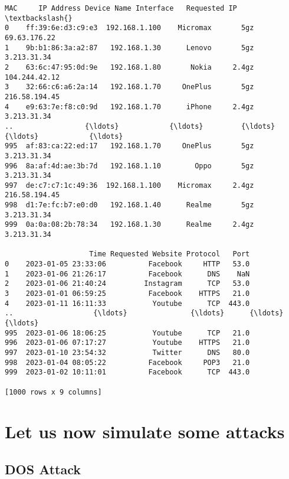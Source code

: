 \documentclass[11pt]{article}
\makeatletter
\newcommand{\boxspacing}{\kern\kvtcb@left@rule\kern\kvtcb@boxsep}
\newcommand{\prompt}[4]{
        {\ttfamily\llap{{\color{#2}[#3]:\hspace{3pt}#4}}\vspace{-\baselineskip}}
    }
\makeatother
\begin{document}
            \begin{tcolorbox}[breakable, size=fbox, boxrule=.5pt, pad at break*=1mm, opacityfill=0]
\prompt{Out}{outcolor}{36}{\boxspacing}
\begin{Verbatim}[commandchars=\\\{\}]
                   MAC     IP Address Device Name Interface   Requested IP  \textbackslash{}
0    ff:39:6e:d3:c9:e3  192.168.1.100    Micromax       5gz   69.63.176.22
1    9b:b1:86:3a:a2:87   192.168.1.30      Lenovo       5gz    3.213.31.34
2    63:6c:47:95:0d:9e   192.168.1.80       Nokia     2.4gz  104.244.42.12
3    32:66:c6:a6:2a:14   192.168.1.70     OnePlus       5gz  216.58.194.45
4    e9:63:7e:f8:c0:9d   192.168.1.70      iPhone     2.4gz    3.213.31.34
..                 {\ldots}            {\ldots}         {\ldots}       {\ldots}            {\ldots}
995  af:83:ca:22:ed:17   192.168.1.70     OnePlus       5gz    3.213.31.34
996  8a:af:4d:ae:3b:7d   192.168.1.10        Oppo       5gz    3.213.31.34
997  de:c7:c7:1c:49:36  192.168.1.100    Micromax     2.4gz  216.58.194.45
998  d1:7e:fc:b7:e0:d0   192.168.1.40      Realme       5gz    3.213.31.34
999  0a:0a:08:2b:78:34   192.168.1.30      Realme     2.4gz    3.213.31.34

                    Time Requested Website Protocol   Port
0    2023-01-05 23:33:06          Facebook     HTTP   53.0
1    2023-01-06 21:26:17          Facebook      DNS    NaN
2    2023-01-06 21:40:24         Instagram      TCP   53.0
3    2023-01-01 06:59:25          Facebook    HTTPS   21.0
4    2023-01-11 16:11:33           Youtube      TCP  443.0
..                   {\ldots}               {\ldots}      {\ldots}    {\ldots}
995  2023-01-06 18:06:25           Youtube      TCP   21.0
996  2023-01-06 07:17:27           Youtube    HTTPS   21.0
997  2023-01-10 23:54:32           Twitter      DNS   80.0
998  2023-01-04 08:05:22          Facebook     POP3   21.0
999  2023-01-02 10:11:01          Facebook      TCP  443.0

[1000 rows x 9 columns]
\end{Verbatim}
\end{tcolorbox}
        
    \hypertarget{let-us-now-simulate-some-attacks}{%
\section{Let us now simulate some
attacks}\label{let-us-now-simulate-some-attacks}}

    \hypertarget{dos-attack}{%
\subsection{DOS Attack}\label{dos-attack}}
\end{document}
